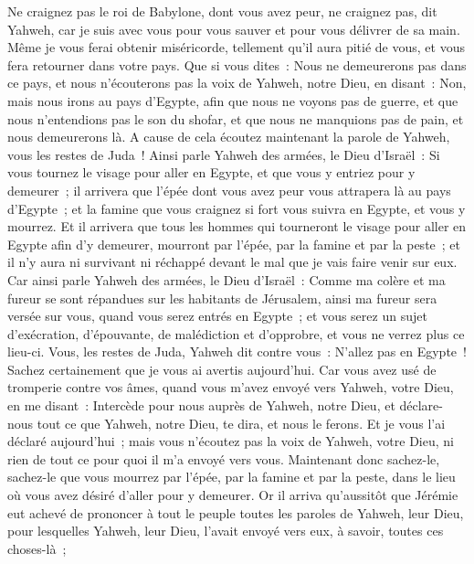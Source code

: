\begin{multicols}{2}
Ne craignez pas le roi de Babylone, dont vous avez peur, ne craignez pas, dit Yahweh, car je suis avec vous pour vous sauver et pour vous délivrer de sa main.
Même je vous ferai obtenir miséricorde, tellement qu'il aura pitié de vous, et vous fera retourner dans votre pays.
Que si vous dites~: Nous ne demeurerons pas dans ce pays, et nous n'écouterons pas la voix de Yahweh, notre Dieu,
en disant~: Non, mais nous irons au pays d'Egypte, afin que nous ne voyons pas de guerre, et que nous n'entendions pas le son du shofar, et que nous ne manquions pas de pain, et nous demeurerons là.
A cause de cela écoutez maintenant la parole de Yahweh, vous les restes de Juda~! Ainsi parle Yahweh des armées, le Dieu d'Israël~: Si vous tournez le visage pour aller en Egypte, et que vous y entriez pour y demeurer~;
il arrivera que l'épée dont vous avez peur vous attrapera là au pays d'Egypte~; et la famine que vous craignez si fort vous suivra en Egypte, et vous y mourrez.
Et il arrivera que tous les hommes qui tourneront le visage pour aller en Egypte afin d'y demeurer, mourront par l'épée, par la famine et par la peste~; et il n'y aura ni survivant ni réchappé devant le mal que je vais faire venir sur eux.
Car ainsi parle Yahweh des armées, le Dieu d'Israël~: Comme ma colère et ma fureur se sont répandues sur les habitants de Jérusalem, ainsi ma fureur sera versée sur vous, quand vous serez entrés en Egypte~; et vous serez un sujet d'exécration, d'épouvante, de malédiction et d'opprobre, et vous ne verrez plus ce lieu-ci.
Vous, les restes de Juda, Yahweh dit contre vous~: N'allez pas en Egypte~! Sachez certainement que je vous ai avertis aujourd'hui.
Car vous avez usé de tromperie contre vos âmes, quand vous m'avez envoyé vers Yahweh, votre Dieu, en me disant~: Intercède pour nous auprès de Yahweh, notre Dieu, et déclare-nous tout ce que Yahweh, notre Dieu, te dira, et nous le ferons.
Et je vous l'ai déclaré aujourd'hui~; mais vous n'écoutez pas la voix de Yahweh, votre Dieu, ni rien de tout ce pour quoi il m'a envoyé vers vous.
Maintenant donc sachez-le, sachez-le que vous mourrez par l'épée, par la famine et par la peste, dans le lieu où vous avez désiré d'aller pour y demeurer.
\VerseOne{}Or il arriva qu'aussitôt que Jérémie eut achevé de prononcer à tout le peuple toutes les paroles de Yahweh, leur Dieu, pour lesquelles Yahweh, leur Dieu, l'avait envoyé vers eux, à savoir, toutes ces choses-là~;

\end{multicols}
